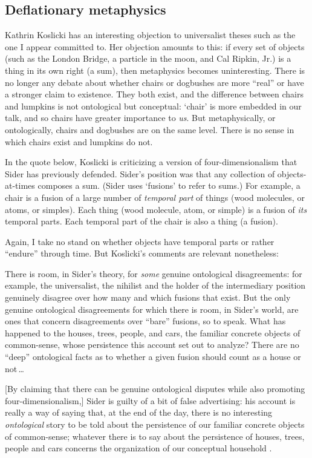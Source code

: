 \documentclass[11pt]{article}
\newenvironment{squote}{%
\begin{spacing}{1}
\begin{list}{}{%
\setlength{\labelwidth}{0pt}%
\rightmargin\leftmargin%
}
\item\relax
}{%
\end{list}%
\end{spacing}
}
\begin{document}
\begin{spacing}{1.5}
\subsection{Deflationary metaphysics}
\label{deflate}
Kathrin Koslicki has an interesting objection to universalist theses
such as the one I appear committed to.  Her objection amounts to this:
if every set of objects (such as the London Bridge, a particle in the
moon, and Cal Ripkin, Jr.) is a thing in its own right (a sum), then
metaphysics becomes uninteresting.  There is no longer any debate
about whether chairs or dogbushes are more ``real'' or have a stronger
claim to existence.  They both exist, and the difference between
chairs and lumpkins is not ontological but conceptual: `chair' is more
embedded in our talk, and so chairs have greater importance to {\em
  us}.  But metaphysically, or ontologically, chairs and dogbushes are
on the same level.  There is no sense in which chairs exist and
lumpkins do not.

In the quote below, Koslicki is criticizing a version of
four-dimensionalism that Sider has previously defended.  Sider's
position was that any collection of objects-at-times composes a sum.
(Sider uses `fusions' to refer to sums.)  For example, a chair is a
fusion of a large number of {\em temporal part} of things (wood
molecules, or atoms, or simples).  Each thing (wood molecule, atom, or
simple) is a fusion of {\em its} temporal parts.  Each temporal part
of the chair is also a thing (a fusion).

Again, I take no stand on whether objects have temporal parts or
rather ``endure'' through time.  But Koslicki's comments are relevant
nonetheless:

\begin{squote}
There is room, in Sider's theory, for {\em some} genuine ontological
disagreements: for example, the universalist, the nihilist and the
holder of the intermediary position genuinely disagree over how many
and which fusions that exist.  But the only genuine ontological
disagreements for which there is room, in Sider's world, are ones that
concern disagreements over ``bare'' fusions, so to speak.  What has
happened to the houses, trees, people, and cars, the familiar concrete
objects of common-sense, whose persistence this account set out to
analyze?  There are no ``deep'' ontological facts as to whether a
given fusion should count as a house or not\,\ldots

[By claiming that there can be genuine ontological disputes while also
  promoting four-dimensionalism,] Sider is guilty of a bit of false
advertising: his account is really a way of saying that, at the end of
the day, there is no interesting {\em ontological} story to be told
about the persistence of our familiar concrete objects of
common-sense; whatever there is to say about the persistence of
houses, trees, people and cars concerns the organization of our
conceptual household \citeyearpar[124--125]{koslicki2003}.
\end{squote}


\end{spacing}
\end{document}
